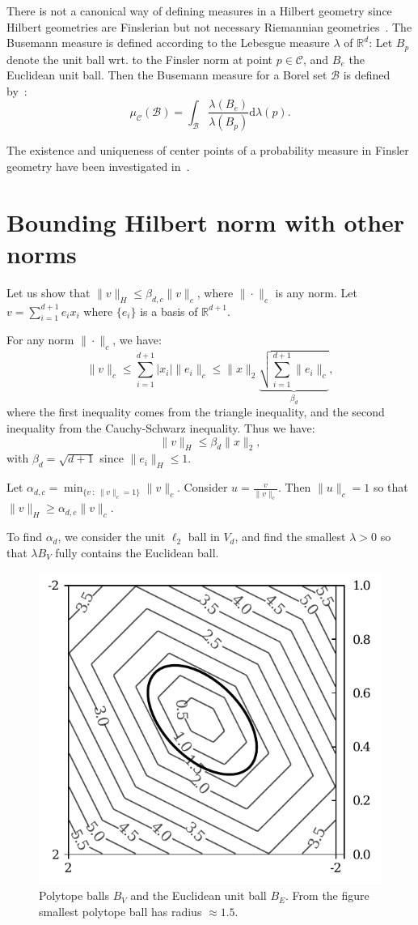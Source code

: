 \documentclass[graybox]{svmult}
\def\calB{\mathcal{B}}
\def\calC{\mathcal{C}}
\def\bbR{\mathbb{R}}
\def\st{\ :\ }
\begin{document}
There is not a canonical way of defining measures in a Hilbert geometry since Hilbert geometries are Finslerian but not necessary Riemannian geometries~\cite{Vernicos-2004}. The Busemann measure is defined according to the Lebesgue measure $\lambda$ of $\bbR^d$: Let $B_p$ denote the unit ball wrt. to the Finsler norm at point $p\in\calC$, and $B_e$ the Euclidean unit ball. Then the Busemann measure for a Borel set $\calB$ is defined by~\cite{Vernicos-2004}:
$$
\mu_\calC(\calB) = \int_\calB \frac{\lambda(B_e)}{\lambda(B_p)} \mathrm{d}\lambda(p).
$$

The existence and uniqueness of center points of a probability measure in Finsler geometry have been investigated in~\cite{FinslerCenter-2012}.

\section{Bounding Hilbert norm with other norms}
Let us show that $\|v\|_H\leq \beta_{d,c} \|v\|_c$, where $\|\cdot\|_c$ 
is any norm.
Let $v=\sum_{i=1}^{d+1} e_i x_i$ where $\{e_i\}$ is a basis of $\bbR^{d+1}$.

For any norm $\|\cdot\|_c$, we have:
$$
\|v\|_c \leq \sum_{i=1}^{d+1} |x_i|  \|e_i\|_c \leq \|x\|_2 
\underbrace{\sqrt{\sum_{i=1}^{d+1} \|e_i\|_c}}_{\beta_d},
$$
where the first inequality comes from the triangle inequality, and the 
second inequality from the Cauchy-Schwarz inequality.
Thus we have:
$$
\|v\|_H \leq \beta_d \|x\|_2,
$$
with $\beta_d=\sqrt{d+1}$ since $\|e_i\|_H\leq 1$.

Let $\alpha_{d,c}=\min_{\{v \st \|v\|_c = 1\}} \|v\|_c$.
Consider $u=\frac{v}{\|v\|_c}$. Then $\|u\|_c=1$ so that $\|v\|_H\geq 
\alpha_{d,c} \|v\|_c$.

To find $\alpha_d$, we consider the unit $\ell_2$ ball in $V_d$, and 
find the smallest $\lambda>0$ so that
$\lambda B_V$ fully contains the Euclidean ball.

\begin{figure}
\centering
\includegraphics[width=.5\textwidth]{boundnorm}
\caption{Polytope balls $B_V$ and the Euclidean unit ball $B_E$. From the figure
smallest polytope ball has radius $\approx1.5$.}
\end{figure}
\end{document}
